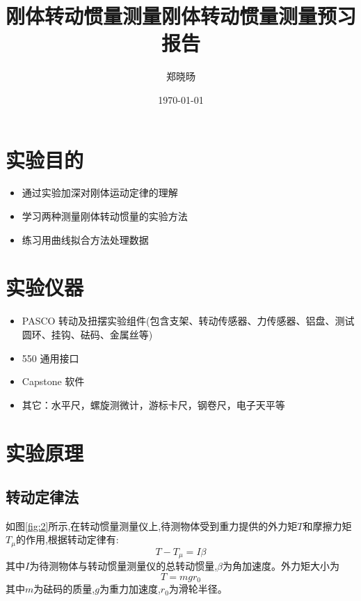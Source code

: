 \documentclass[UTF8]{ctexart}
\title{刚体转动惯量测量}
\title{刚体转动惯量测量预习报告}
\author{郑晓旸}
\date{\today}
\begin{document}
\fancyfoot[C]{\thepage}

\maketitle
\tableofcontents
\newpage

\section{实验目的}
    \begin{itemize}
        \item 通过实验加深对刚体运动定律的理解
        \item 学习两种测量刚体转动惯量的实验方法
        \item 练习用曲线拟合方法处理数据
    \end{itemize}

\section{实验仪器}
\begin{itemize}
    \item PASCO 转动及扭摆实验组件(包含支架、转动传感器、力传感器、铝盘、测试圆环、挂钩、砝码、金属丝等)
    \item 550 通用接口
    \item Capstone 软件
    \item 其它：水平尺，螺旋测微计，游标卡尺，钢卷尺，电子天平等
\end{itemize}

\section{实验原理}

    \subsection{转动定律法}
    
    如图\ref{fig:2}所示,在转动惯量测量仪上,待测物体受到重力提供的外力矩$T$和摩擦力矩$T_\mu$的作用,根据转动定律有:
    \begin{equation}
    T-T_\mu=I\beta \label{eq:5}
    \end{equation}
    其中$I$为待测物体与转动惯量测量仪的总转动惯量,$\beta$为角加速度。外力矩大小为
    \begin{equation}
    T=mgr_0 \label{eq:6}
    \end{equation}
    其中$m$为砝码的质量,$g$为重力加速度,$r_0$为滑轮半径。
    
\end{document}
